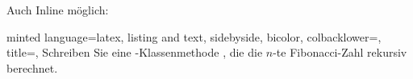 \documentclass[
    ngerman,
    accentcolor=3b,
    dark_mode,
    fontsize= 12pt,
    a4paper,
    aspectratio=169,
    colorback=true,
    fancy_row_colors,
    leqno,
    fleqn,
    boxarc=3pt,
    fleqn,
]{algoslides}
\begin{document}
    \begin{frame}[c, fragile]
        \slidehead{}
        Auch Inline möglich:
        \begin{newcb}[
            fontsize=\scriptsize,
            escapeinside=||,
            ]{
            minted language=latex,
            listing and text,
            sidebyside,
            bicolor,
            colbacklower=,
            title=,
            }
            Schreiben Sie eine -Klassenmethode , die die $n$-te Fibonacci-Zahl rekursiv berechnet.
        \end{newcb}
    \end{frame}
\end{document}
